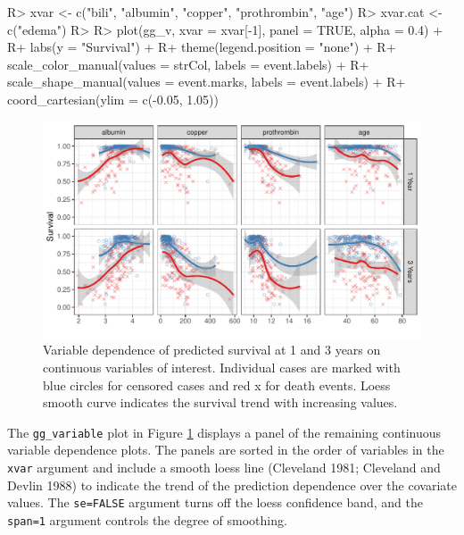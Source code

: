 \documentclass[article, nojss]{jss}
\begin{document}
\begin{Schunk}
\begin{Sinput}
R> xvar <- c("bili", "albumin", "copper", "prothrombin", "age")
R> xvar.cat <- c("edema")
R>
R> plot(gg_v, xvar = xvar[-1], panel = TRUE, alpha = 0.4) +
R+   labs(y = "Survival") +
R+   theme(legend.position = "none") +
R+   scale_color_manual(values = strCol, labels = event.labels) +
R+   scale_shape_manual(values = event.marks, labels = event.labels) +
R+   coord_cartesian(ylim = c(-0.05, 1.05))
\end{Sinput}
\begin{figure}[!htb]

{\centering \includegraphics{rfs-variable-plot-1}

}

\caption[Variable dependence of predicted survival at 1 and 3 years on continuous variables of interest]{Variable dependence of predicted survival at 1 and 3 years on continuous variables of interest. Individual cases are marked with blue circles for censored cases and red x for death events. Loess smooth curve indicates the survival trend with increasing values.}\label{fig:variable-plot}
\end{figure}
\end{Schunk}

The \texttt{gg\_variable} plot in Figure \ref{fig:variable-plot}
displays a panel of the remaining continuous variable dependence plots.
The panels are sorted in the order of variables in the \texttt{xvar}
argument and include a smooth loess line (Cleveland 1981; Cleveland and
Devlin 1988) to indicate the trend of the prediction dependence over the
covariate values. The \texttt{se=FALSE} argument turns off the loess
confidence band, and the \texttt{span=1} argument controls the degree of
smoothing.
\end{document}
